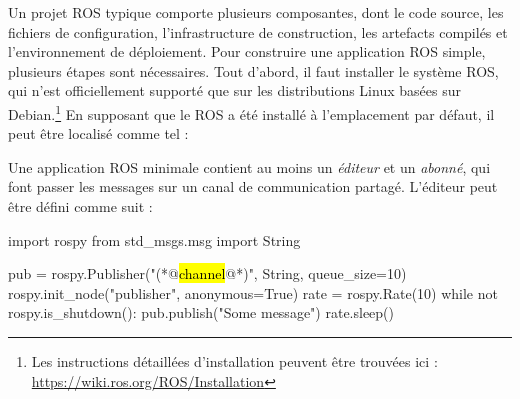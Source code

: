 Un projet ROS typique comporte plusieurs composantes, dont le code source, les fichiers de configuration, l'infrastructure de construction, les artefacts compilés et l'environnement de déploiement. Pour construire une application ROS simple, plusieurs étapes sont nécessaires. Tout d'abord, il faut installer le système ROS, qui n'est officiellement supporté que sur les distributions Linux basées sur Debian.\hspace{-.08em}\footnote{Les instructions détaillées d'installation peuvent être trouvées ici : \url{https://wiki.ros.org/ROS/Installation}}
%
En supposant que le ROS a été installé à l'emplacement par défaut, il peut être localisé comme tel :
%
%
Une application ROS minimale contient au moins un \textit{éditeur} et un \textit{abonné}, qui font passer les messages sur un canal de communication partagé. L'éditeur peut être défini comme suit :
%
\begin{pythonlisting}[title=./catkin\_ws/src/pubsub/publisher.py]
import rospy
from std_msgs.msg import String

pub = rospy.Publisher("(*@\hl{channel}@*)", String, queue_size=10)
rospy.init_node("publisher", anonymous=True)
rate = rospy.Rate(10)
while not rospy.is_shutdown():
pub.publish("Some message")
rate.sleep()
\end{pythonlisting}
%
